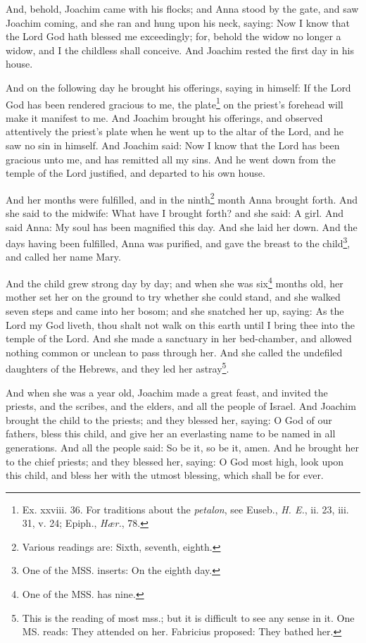\documentclass[12pt]{book} %
\begin{document}
\begin{pairs}
\begin{Rightside}
\pend\pstart
And, behold, Joachim came with his flocks; and Anna stood by the gate, and saw Joachim coming, and she ran and hung upon his neck, saying: Now I know that the Lord God hath blessed me exceedingly; for, behold the widow no longer a widow, and I the childless shall conceive. And Joachim rested the first day in his house.

\pend\pstart
{}

\pend\pstart
And on the following day he brought his offerings, saying in himself: If the Lord God has been rendered gracious to me, the plate\footnote{Ex. xxviii. 36. For traditions about the \textit{petalon}, see Euseb., \textit{H. E.}, ii. 23, iii. 31, v. 24; Epiph., \textit{Hær.}, 78.} on the priest's forehead will make it manifest to me. And Joachim brought his offerings, and observed attentively the priest's plate when he went up to the altar of the Lord, and he saw no sin in himself. And Joachim said: Now I know that the Lord has been gracious unto me, and has remitted all my sins. And he went down from the temple of the Lord justified, and departed to his own house.

\pend\pstart
And her months were fulfilled, and in the ninth\footnote{Various readings are: Sixth, seventh, eighth.} month Anna brought forth. And she said to the midwife: What have I brought forth? and she said: A girl. And said Anna: My soul has been magnified this day. And she laid her down. And the days having been fulfilled, Anna was purified, and gave the breast to the child\footnote{One of the MSS. inserts: On the eighth day.}, and called her name Mary.

\pend\pstart
{}

\pend\pstart
And the child grew strong day by day; and when she was six\footnote{One of the MSS. has nine.} months old, her mother set her on the ground to try whether she could stand, and she walked seven steps and came into her bosom; and she snatched her up, saying: As the Lord my God liveth, thou shalt not walk on this earth until I bring thee into the temple of the Lord. And she made a sanctuary in her bed-chamber, and allowed nothing common or unclean to pass through her. And she called the undefiled daughters of the Hebrews, and they led her astray\footnote{This is the reading of most mss.; but it is difficult to see any sense in it. One MS. reads: They attended on her. Fabricius proposed: They bathed her.}.

\pend\pstart
And when she was a year old, Joachim made a great feast, and invited the priests, and the scribes, and the elders, and all the people of Israel. And Joachim brought the child to the priests; and they blessed her, saying: O God of our fathers, bless this child, and give her an everlasting name to be named in all generations. And all the people said: So be it, so be it, amen. And he brought her to the chief priests; and they blessed her, saying: O God most high, look upon this child, and bless her with the utmost blessing, which shall be for ever.


\end{Rightside}
\end{pairs}
\end{document}
